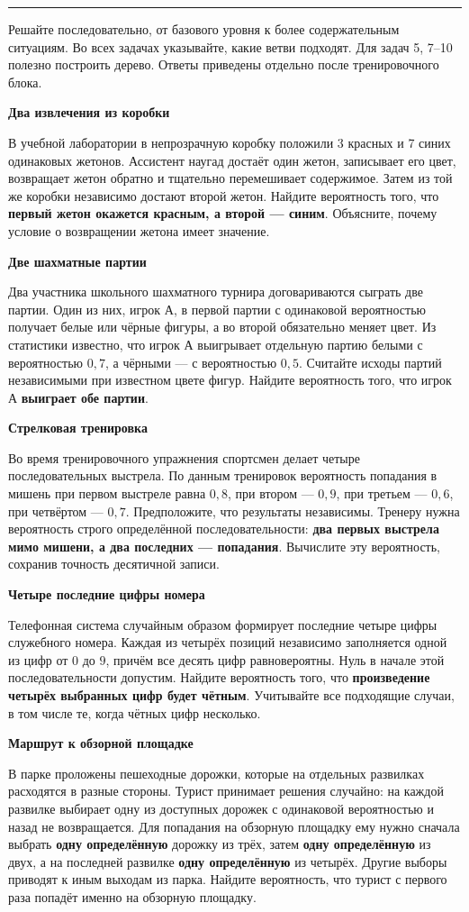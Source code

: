 \documentclass[a4paper,12pt]{article}
\newcommand{\sect}[1]{\needspace{5\baselineskip}\vspace{8pt}{\Large\color{darkaccent}\bfseries #1}\par\vspace{2pt}\noindent\textcolor{linegray}{\rule{\linewidth}{0.65pt}}\vspace{3pt}}
\newcommand{\exercise}[2]{\needspace{7\baselineskip}\vspace{7pt}\noindent{\large\color{darkaccent}\bfseries #1.}\hspace{6pt}\textbf{#2}\par\vspace{1pt}}
\begin{document}
\sect{9. Тренировочный блок: 10 задач}
\textcolor{muted}{Решайте последовательно, от базового уровня к более содержательным ситуациям. Во всех задачах указывайте, какие ветви подходят. Для задач 5, 7--10 полезно построить дерево. Ответы приведены отдельно после тренировочного блока.}

\exercise{1}{Два извлечения из коробки}
В учебной лаборатории в непрозрачную коробку положили 3 красных и 7 синих одинаковых жетонов. Ассистент наугад достаёт один жетон, записывает его цвет, возвращает жетон обратно и тщательно перемешивает содержимое. Затем из той же коробки независимо достают второй жетон. Найдите вероятность того, что \textbf{первый жетон окажется красным, а второй — синим}. Объясните, почему условие о возвращении жетона имеет значение.

\exercise{2}{Две шахматные партии}
Два участника школьного шахматного турнира договариваются сыграть две партии. Один из них, игрок А, в первой партии с одинаковой вероятностью получает белые или чёрные фигуры, а во второй обязательно меняет цвет. Из статистики известно, что игрок А выигрывает отдельную партию белыми с вероятностью \(0{,}7\), а чёрными — с вероятностью \(0{,}5\). Считайте исходы партий независимыми при известном цвете фигур. Найдите вероятность того, что игрок А \textbf{выиграет обе партии}.

\exercise{3}{Стрелковая тренировка}
Во время тренировочного упражнения спортсмен делает четыре последовательных выстрела. По данным тренировок вероятность попадания в мишень при первом выстреле равна \(0{,}8\), при втором — \(0{,}9\), при третьем — \(0{,}6\), при четвёртом — \(0{,}7\). Предположите, что результаты независимы. Тренеру нужна вероятность строго определённой последовательности: \textbf{два первых выстрела мимо мишени, а два последних — попадания}. Вычислите эту вероятность, сохранив точность десятичной записи.

\exercise{4}{Четыре последние цифры номера}
Телефонная система случайным образом формирует последние четыре цифры служебного номера. Каждая из четырёх позиций независимо заполняется одной из цифр от \(0\) до \(9\), причём все десять цифр равновероятны. Нуль в начале этой последовательности допустим. Найдите вероятность того, что \textbf{произведение четырёх выбранных цифр будет чётным}. Учитывайте все подходящие случаи, в том числе те, когда чётных цифр несколько.

\exercise{5}{Маршрут к обзорной площадке}
В парке проложены пешеходные дорожки, которые на отдельных развилках расходятся в разные стороны. Турист принимает решения случайно: на каждой развилке выбирает одну из доступных дорожек с одинаковой вероятностью и назад не возвращается. Для попадания на обзорную площадку ему нужно сначала выбрать \textbf{одну определённую} дорожку из трёх, затем \textbf{одну определённую} из двух, а на последней развилке \textbf{одну определённую} из четырёх. Другие выборы приводят к иным выходам из парка. Найдите вероятность, что турист с первого раза попадёт именно на обзорную площадку.
\end{document}
